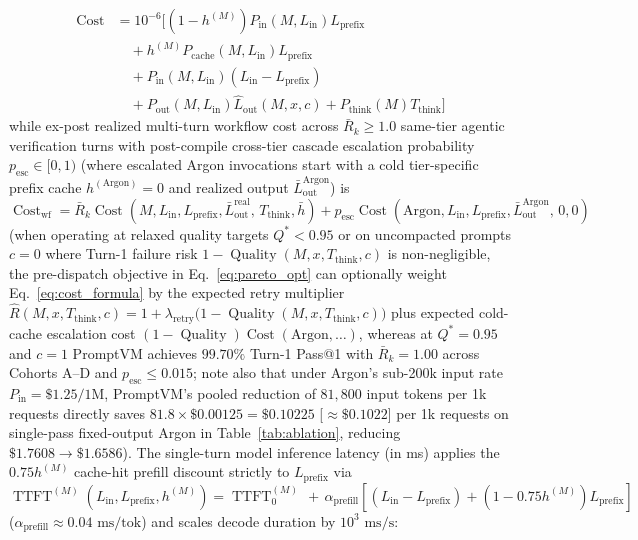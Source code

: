 \documentclass[conference,10pt]{IEEEtran}
\begin{document}
\begin{equation}
\label{eq:cost_formula}
\begin{split}
\operatorname{Cost} &= 10^{-6} \Big[ (1 - h^{(M)}) P_{\text{in}}(M, L_{\text{in}}) L_{\text{prefix}} \\
&\quad + h^{(M)} P_{\text{cache}}(M, L_{\text{in}}) L_{\text{prefix}} \\
&\quad + P_{\text{in}}(M, L_{\text{in}})(L_{\text{in}} - L_{\text{prefix}}) \\
&\quad + P_{\text{out}}(M, L_{\text{in}}) \hat{L}_{\text{out}}(M, x, c) + P_{\text{think}}(M) T_{\text{think}} \Big]
\end{split}
\end{equation}
while ex-post realized multi-turn workflow cost across $\bar{R}_k \ge 1.0$ same-tier agentic verification turns with post-compile cross-tier cascade escalation probability $p_{\text{esc}} \in [0, 1)$ (where escalated Argon invocations start with a cold tier-specific prefix cache $h^{(\text{Argon})} = 0$ and realized output $\bar{L}_{\text{out}}^{\text{Argon}}$) is $\operatorname{Cost}_{\text{wf}} = \bar{R}_k \operatorname{Cost}(M, L_{\text{in}}, L_{\text{prefix}}, \bar{L}_{\text{out}}^{\text{real}},\, T_{\text{think}}, \bar{h}) + p_{\text{esc}} \operatorname{Cost}(\text{Argon}, L_{\text{in}}, L_{\text{prefix}}, \bar{L}_{\text{out}}^{\text{Argon}},\, 0, 0)$ (when operating at relaxed quality targets $Q^* < 0.95$ or on uncompacted prompts $c = 0$ where Turn-1 failure risk $1 - \operatorname{Quality}(M, x, T_{\text{think}}, c)$ is non-negligible, the pre-dispatch objective in Eq.~\ref{eq:pareto_opt} can optionally weight Eq.~\ref{eq:cost_formula} by the expected retry multiplier $\hat{R}(M, x, T_{\text{think}}, c) = 1 + \lambda_{\text{retry}}\big(1 - \operatorname{Quality}(M, x, T_{\text{think}}, c)\big)$ plus expected cold-cache escalation cost $(1 - \operatorname{Quality})\operatorname{Cost}(\text{Argon}, \dots)$, whereas at $Q^* = 0.95$ and $c = 1$ PromptVM achieves $99.70\%$ Turn-1 Pass@1 with $\bar{R}_k = 1.00$ across Cohorts A--D and $p_{\text{esc}} \le 0.015$; note also that under Argon's sub-200k input rate $P_{\text{in}}=\$1.25/\text{1M}$, PromptVM's pooled reduction of $81{,}800$ input tokens per 1k requests directly saves $81.8 \times \$0.00125 = \$0.10225$ [$\approx \$0.1022$] per 1k requests on single-pass fixed-output Argon in Table~\ref{tab:ablation}, reducing $\$1.7608 \to \$1.6586$). The single-turn model inference latency (in ms) applies the $0.75 h^{(M)}$ cache-hit prefill discount strictly to $L_{\text{prefix}}$ via $\operatorname{TTFT}^{(M)}(L_{\text{in}}, L_{\text{prefix}}, h^{(M)}) = \operatorname{TTFT}_0^{(M)}\, +\, \alpha_{\text{prefill}}\left[(L_{\text{in}} - L_{\text{prefix}}) + (1 - 0.75 h^{(M)})L_{\text{prefix}}\right]$ ($\alpha_{\text{prefill}} \approx 0.04\text{ ms/tok}$) and scales decode duration by $10^3\text{ ms/s}$:
\end{document}
